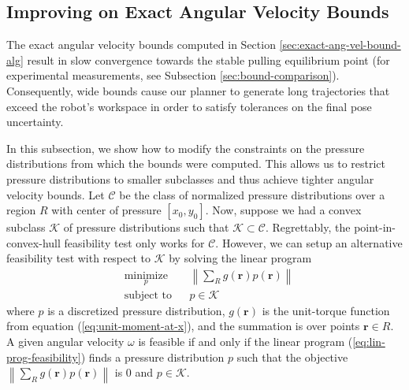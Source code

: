 \documentclass[conference]{IEEEtran}
\begin{document}

\subsection{Improving on Exact Angular Velocity Bounds}\label{sec:point-in-moment-enve}


The exact angular velocity bounds computed in Section
\ref{sec:exact-ang-vel-bound-alg} result in slow convergence towards
the stable pulling equilibrium point (for experimental measurements,
see Subsection \ref{sec:bound-comparison}). Consequently, wide bounds
cause our planner to generate long trajectories that exceed the
robot's workspace in order to satisfy tolerances on the final pose
uncertainty.

In this subsection, we show how to modify the constraints on the
pressure distributions from which the bounds were computed. This
allows us to restrict pressure distributions to smaller subclasses and
thus achieve tighter angular velocity bounds. Let $\mathcal{C}$ be the
class of normalized pressure distributions over a region $R$ with
center of pressure $[x_0, y_0]$.
Now, suppose we had a convex subclass $\mathcal{K}$ of pressure
distributions such that $\mathcal{K} \subset
\mathcal{C}$. Regrettably, the point-in-convex-hull feasibility test
only works for $\mathcal{C}$. However, we can setup an alternative
feasibility test with respect to $\mathcal{K}$ by solving the linear
program
\begin{equation}
  \begin{aligned}
    & \underset{p}{\text{minimize}}
    & & \left\lVert \sum_Rg(\mathbf{r})p(\mathbf{r})\right\rVert \\
    & \text{subject to} 
    & & p \in \mathcal{K}
  \end{aligned} \label{eq:lin-prog-feasibility}
\end{equation}
where $p$ is a discretized pressure distribution, $g(\mathbf{r})$ is
the unit-torque function from equation (\ref{eq:unit-moment-at-x}),
and the summation is over points $\mathbf{r} \in R$. A given angular
velocity $\omega$ is feasible if and only if the linear program
(\ref{eq:lin-prog-feasibility}) finds a pressure distribution $p$ such
that the objective
$\left\lVert \sum_Rg(\mathbf{r})p(\mathbf{r})\right\rVert$ is $0$ and
$p \in \mathcal{K}$.
\end{document}
